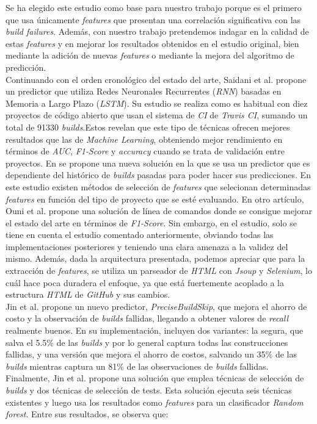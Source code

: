 Se ha elegido este estudio \cite{2} como base para nuestro trabajo porque es el primero que usa
únicamente \textit{features} que presentan una correlación significativa con las \textit{build
failures}. Además, con nuestro trabajo pretendemos indagar en la calidad de estas \textit{features}
y en mejorar los resultados obtenidos en el estudio original, bien mediante la adición de nuevas
\textit{features} o mediante la mejora del algoritmo de predicción.\\

Continuando con el orden cronológico del estado del arte, Saidani et al. \cite{15} propone un
predictor que utiliza Redes Neuronales Recurrentes (\textit{RNN}) basadas en Memoria a Largo
Plazo (\textit{LSTM}). Su estudio se realiza como es habitual con diez proyectos de código
abierto que usan el sistema de \textit{CI} de \textit{Travis CI}, sumando un total de 91330
\textit{builds}.Estos revelan que este tipo de técnicas ofrecen mejores resultados
que las de \textit{Machine Learning}, obteniendo mejor rendimiento en términos de \textit{AUC},
\textit{F1-Score} y \textit{accuracy} cuando se trata de validación entre proyectos. En \cite{6}
se propone una nueva solución en la que se usa un predictor que es dependiente del histórico de
\textit{builds} pasadas para poder hacer sus predicciones. En este estudio existen métodos de
selección de \textit{features} que selecionan determinadas \textit{features} en función del tipo
de proyecto que se esté evaluando. En otro artículo, Ouni et al. \cite{14} propone una solución
de línea de comandos donde se consigue mejorar el estado del arte en términos de \textit{F1-Score}.
Sin embargo, en el estudio, solo se tiene en cuenta el estudio \cite{7} comentado anteriormente,
obviando todas las implementaciones posteriores y teniendo una clara amenaza a la validez del
mismo. Además, dada la arquitectura presentada, podemos apreciar que para la extracción de
\textit{features}, se utiliza un parseador de \textit{HTML} con \textit{Jsoup} y \textit{Selenium},
lo cuál hace poca duradera el enfoque, ya que está fuertemente acoplado a la estructura
\textit{HTML} de \textit{GitHub} y sus cambios. \\

Jin et al. \cite{4} propone un nuevo predictor, \textit{PreciseBuildSkip}, que mejora el ahorro
de costo y la observación de \textit{builds} fallidas, llegando a obtener valores de
\textit{recall} realmente buenos. En su implementación, incluyen dos variantes: la segura, que
salva el 5.5\% de las \textit{builds} y por lo general captura todas las construcciones fallidas,
y una versión que mejora el ahorro de costos, salvando un 35\% de las \textit{builds} mientras
captura un 81\% de las observaciones de \textit{builds} fallidas. Finalmente, Jin et al. \cite{1} propone
una solución que emplea técnicas de selección de \textit{builds} y dos técnicas de selección de
tests. Esta solución ejecuta seis técnicas existentes y luego usa los resultados como
\textit{features} para un clasificador \textit{Random forest}. Entre sus resultados, se observa
que:


